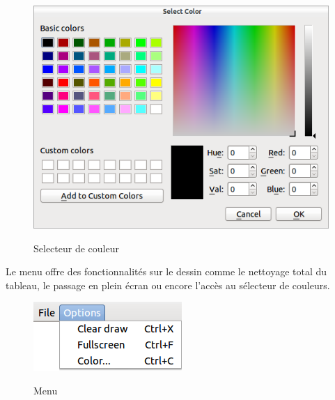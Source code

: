 \documentclass{report}
\begin{document}
				\begin{figure}[!h]
						\centering
						\includegraphics[scale=0.4]{../images/colorpicker.png}\\
						\caption{Selecteur de couleur}
						\label{Selecteur de couleur}
				\end{figure}
				
				Le menu offre des fonctionnalités sur le dessin comme le nettoyage total du tableau, le passage en plein écran ou encore l'accès au sélecteur de couleurs. \\
				\begin{figure}[!h]
						\centering
						\includegraphics[scale=0.4]{../images/menu.png}\\
						\caption{Menu}
						\label{Menu}
				\end{figure}
				
\end{document}
